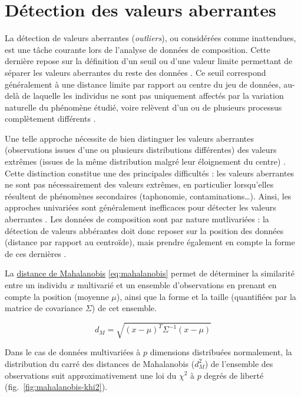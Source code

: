 \documentclass[
  french,
]{scrbook}
\begin{document}
\hypertarget{coda-outliers}{%
\chapter{Détection des valeurs aberrantes}\label{coda-outliers}}

La détection de valeurs aberrantes (\emph{outliers}), ou considérées comme inattendues, est une tâche courante lors de l'analyse de données de composition. Cette dernière repose sur la définition d'un seuil ou d'une valeur limite permettant de séparer les valeurs aberrantes du reste des données \autocite{filzmoser2005,reimann2005}. Ce seuil correspond généralement à une distance limite par rapport au centre du jeu de données, au-delà de laquelle les individus ne sont pas uniquement affectés par la variation naturelle du phénomène étudié, voire relèvent d'un ou de plusieurs processus complètement différents \autocite{filzmoser2005}.

Une telle approche nécessite de bien distinguer les valeurs aberrantes (observations issues d'une ou plusieurs distributions différentes) des valeurs extrêmes (issues de la même distribution malgré leur éloignement du centre) \autocite{reimann2005}. Cette distinction constitue une des principales difficultés : les valeurs aberrantes ne sont pas nécessairement des valeurs extrêmes, en particulier lorsqu'elles résultent de phénomènes secondaires (taphonomie, contaminations\ldots). Ainsi, les approches univariées sont généralement inefficaces pour détecter les valeurs aberrantes \autocite{filzmoser2005}. Les données de composition sont par nature mutlivariées : la détection de valeurs abbérantes doit donc reposer sur la position des données (distance par rapport au centroïde), mais prendre également en compte la forme de ces dernières \autocite{filzmoser2005}.

La \href{https://fr.wikipedia.org/wiki/Distance_de_Mahalanobis}{distance de Mahalanobis} \eqref{eq:mahalanobis} permet de déterminer la similarité entre un individu \(x\) multivarié et un ensemble d'observations en prenant en compte la position (moyenne \(\mu\)), ainsi que la forme et la taille (quantifiées par la matrice de covariance \(\Sigma\)) de cet ensemble.

\begin{equation}
  d_M = \sqrt{ (x - \mu)^T \Sigma^{-1} (x - \mu) }
  \label{eq:mahalanobis}
\end{equation}

Dans le cas de données multivariées à \(p\) dimensions distribuées normalement, la distribution du carré des distances de Mahalanobis (\(d_M^2\)) de l'ensemble des observations suit approximativement une loi du \(\chi^2\) à \(p\) degrés de liberté (fig.~\ref{fig:mahalanobis-khi2}).
\end{document}
